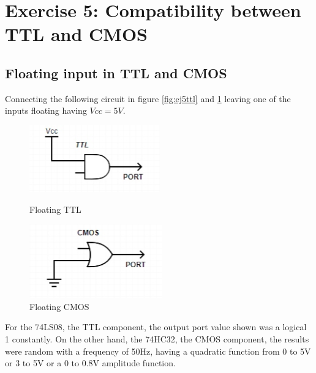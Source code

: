 



%
%
%

\section{\color{olive}Exercise 5: Compatibility between TTL and CMOS}

\subsection{\color{purple}Floating input in TTL and CMOS}

Connecting the following circuit in figure \ref{fig:ej5ttl} and \ref{fig:ej5cmos} leaving one of the inputs floating having $Vcc = 5V$. 

\begin{figure}[h!]
         \begin{minipage}{.47\linewidth}
        \centering
        \includegraphics[width=.6\linewidth]{./TTL5.png}
        \caption{\color{cyan}Floating TTL}
        \label{fig:ej5ttl}
        \end{minipage}
         \begin{minipage}{.5\linewidth}
        \centering
        \includegraphics[width=.5\linewidth]{./CMOS5.png}
        \caption{\color{cyan}Floating CMOS}
        \label{fig:ej5cmos}
    \end{minipage}
\end{figure}

For the 74LS08, the TTL component, the output port value shown was a logical 1 constantly. On the other hand, the 74HC32, the CMOS component, the results were random with a frequency of 50Hz, having a quadratic function from 0 to 5V or 3 to 5V or a 0 to 0.8V amplitude function.

